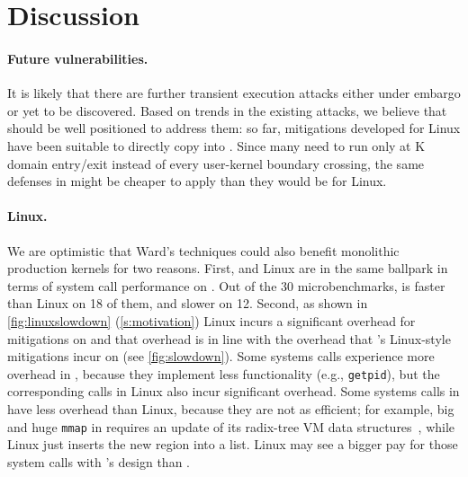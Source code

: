 \section{Discussion}
\label{s:discussion}

\paragraph{Future vulnerabilities.}

It is likely that there are further transient
execution attacks either under embargo or yet to be discovered. Based on trends
in the existing attacks, we believe that \sys should be well positioned to
address them: so far, mitigations developed for Linux have been suitable to
directly copy into \sys. Since many need to run only at K domain entry/exit
instead of every user-kernel boundary crossing, the same defenses in \sys
might be cheaper to apply than they would be for Linux.

\paragraph{Linux.}


We are optimistic that Ward's techniques could also benefit monolithic
production kernels for two reasons.
First, \sys and Linux are in the same ballpark in terms of system call
performance on \bench.  Out of the 30 microbenchmarks, \sys is faster than
Linux on 18 of them, and slower on 12.
Second, as shown in \autoref{fig:linuxslowdown} (\autoref{s:motivation})
Linux incurs a significant overhead for mitigations on \bench and that
overhead is in line with the overhead that \sys's Linux-style mitigations
incur on \bench (see
\autoref{fig:slowdown}).  Some systems calls experience more overhead in
\sys, because they implement less functionality (e.g., \texttt{getpid}),
but the corresponding calls in Linux also incur significant overhead.
Some systems calls in \sys have less overhead than Linux, because they are
not as efficient; for example, big and huge \texttt{mmap} in \sys requires
an update of its radix-tree VM data structures~\cite{clements:radixvm},
while Linux just inserts the new region into a list. Linux may see a
bigger pay for those system calls with \sys's design than \sys.

